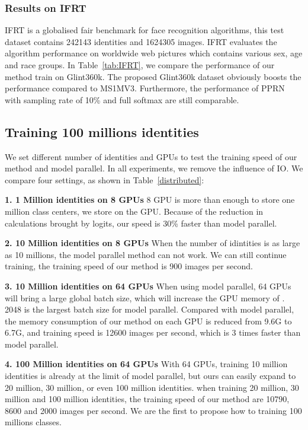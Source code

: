 \documentclass[letterpaper]{article} \usepackage{style/aaai21}  \usepackage{times}  \usepackage{helvet} \usepackage{courier}  \usepackage[hyphens]{url}  \usepackage{graphicx} \usepackage{color}
\begin{document}
\subsubsection{Results on IFRT}
IFRT is a globalised fair benchmark for face recognition algorithms, this test dataset contains 242143 identities and 1624305 images. IFRT evaluates the algorithm performance on worldwide web pictures which contains various sex, age and race groups. In Table~\ref{tab:IFRT}, we compare the performance of our method train on Glint360k. The proposed Glint360k dataset obviously boosts the performance compared to MS1MV3. Furthermore, the performance of PPRN with sampling rate of 10\% and full softmax are still comparable.

\subsection{Training 100 millions identities}
We set different number of identities and GPUs to test the training speed of our method and model parallel. In all experiments, we remove the influence of IO. We compare four settings, as shown in Table~\ref{distributed}:  

\noindent \textbf{1. 1 Million identities on 8 GPUs}  
8 GPU is more than enough to store one million class centers, we store  on the GPU. Because of the reduction in calculations brought by logits, our speed is 30\% faster than model parallel.    

\noindent \textbf{2. 10 Million identities on 8 GPUs}  
When the number of idintities is as large as 10 millions, the model parallel method can not work. We can still continue training, the training speed of our method is 900 images per second.

\noindent \textbf{3. 10 Million identities on 64 GPUs}  
When using model parallel, 64 GPUs will bring a large global batch size, which will increase the GPU memory of . 2048 is the largest batch size for model parallel. Compared with model parallel, the memory consumption of our method on each GPU is reduced from 9.6G to 6.7G, and training speed is 12600 images per second, which is 3 times faster than model parallel.  

\noindent \textbf{4. 100 Million identities on 64 GPUs}
With 64 GPUs, training 10 million identities is already at the limit of model parallel, but ours can easily expand to 20 million, 30 million, or even 100 million identities. when training 20 million, 30 million and 100 million identities, the training speed of our method are 10790, 8600 and 2000 images per second. We are the first to propose how to training 100 millions classes. 
\end{document}
